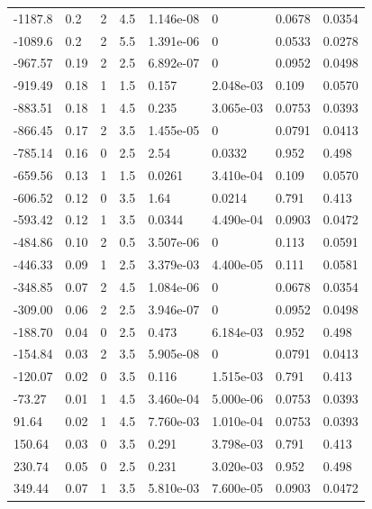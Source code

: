 \documentclass[preview]{standalone}
\begin{document}
{{\begin{tabular}{L{1.2cm}C{1.2cm} C{0.3cm}C{0.5cm} C{1.4cm}C{1.4cm} C{1.4cm}C{1.4cm}}
  -1187.8  &   0.2  & 2     & 4.5 &  1.146e-08  & 0  & 0.0678 &  0.0354   \\ 
  -1089.6  &   0.2  & 2     & 5.5 &  1.391e-06  & 0  & 0.0533 &  0.0278   \\ 
  -967.57  &  0.19  & 2     & 2.5 &  6.892e-07  & 0  & 0.0952 &  0.0498   \\ 
  -919.49  &  0.18  & 1     & 1.5 &  0.157  & 2.048e-03  & 0.109 &  0.0570   \\ 
  -883.51  &  0.18  & 1     & 4.5 &  0.235  & 3.065e-03  & 0.0753 &  0.0393   \\ 
  -866.45  &  0.17  & 2     & 3.5 &  1.455e-05  & 0  & 0.0791 &  0.0413   \\ 
  -785.14  &  0.16  & 0     & 2.5 &  2.54  & 0.0332  & 0.952 &  0.498   \\ 
  -659.56  &  0.13  & 1     & 1.5 &  0.0261  & 3.410e-04  & 0.109 &  0.0570   \\ 
  -606.52  &  0.12  & 0     & 3.5 &  1.64  & 0.0214  & 0.791 &  0.413   \\ 
  -593.42  &  0.12  & 1     & 3.5 &  0.0344  & 4.490e-04  & 0.0903 &  0.0472   \\ 
  -484.86  &  0.10  & 2     & 0.5 &  3.507e-06  & 0  & 0.113 &  0.0591   \\ 
  -446.33  &  0.09  & 1     & 2.5 &  3.379e-03  & 4.400e-05  & 0.111 &  0.0581   \\ 
  -348.85  &  0.07  & 2     & 4.5 &  1.084e-06  & 0  & 0.0678 &  0.0354   \\ 
  -309.00  &  0.06  & 2     & 2.5 &  3.946e-07  & 0  & 0.0952 &  0.0498   \\ 
  -188.70  &  0.04  & 0     & 2.5 &  0.473  & 6.184e-03  & 0.952 &  0.498   \\ 
  -154.84  &  0.03  & 2     & 3.5 &  5.905e-08  & 0  & 0.0791 &  0.0413   \\ 
  -120.07  &  0.02  & 0     & 3.5 &  0.116  & 1.515e-03  & 0.791 &  0.413   \\ 
  -73.27  &  0.01  & 1     & 4.5 &  3.460e-04  & 5.000e-06  & 0.0753 &  0.0393   \\ 
  91.64  &  0.02  & 1     & 4.5 &  7.760e-03  & 1.010e-04  & 0.0753 &  0.0393   \\ 
  150.64  &  0.03  & 0     & 3.5 &  0.291  & 3.798e-03  & 0.791 &  0.413   \\ 
  230.74  &  0.05  & 0     & 2.5 &  0.231  & 3.020e-03  & 0.952 &  0.498   \\ 
  349.44  &  0.07  & 1     & 3.5 &  5.810e-03  & 7.600e-05  & 0.0903 &  0.0472   \\ 

\end{tabular}}}
\end{document}
